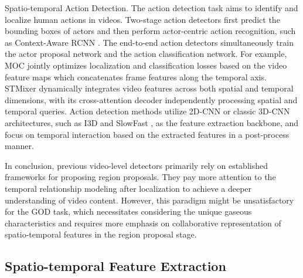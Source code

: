 Spatio-temporal Action Detection. The action detection task aims to identify and localize human actions in videos. Two-stage action detectors \cite{tang2020asynchronous,wu2020context,pan2021actor} first predict the bounding boxes of actors and then perform actor-centric action recognition, such as Context-Aware RCNN \cite{wu2020context}.
The end-to-end action detectors \cite{sun2018actor,girdhar2019video,li2020actions,zhao2022tuber,chen2021watch} simultaneously train the actor proposal network and the action classification network. For example, MOC \cite{li2020actions} jointly optimizes localization and classification losses based on the video feature maps which concatenates frame features along the temporal axis. STMixer \cite{wu2023stmixer} dynamically integrates video features across both spatial and temporal dimensions, with its cross-attention decoder independently processing spatial and temporal queries. Action detection methods utilize 2D-CNN or classic 3D-CNN architectures, such as I3D \cite{carreira2017quo} and SlowFast \cite{feichtenhofer2019slowfast}, as the feature extraction backbone, and focus on temporal interaction based on the extracted features in a post-process manner.

In conclusion, previous video-level detectors primarily rely on established frameworks for proposing region proposals. They pay more attention to the temporal relationship modeling after localization to achieve a deeper understanding of video content. However, this paradigm might be unsatisfactory for the GOD task, which necessitates considering the unique gaseous characteristics and requires more emphasis on collaborative representation of spatio-temporal features in the region proposal stage. 

\subsection{Spatio-temporal Feature Extraction}

